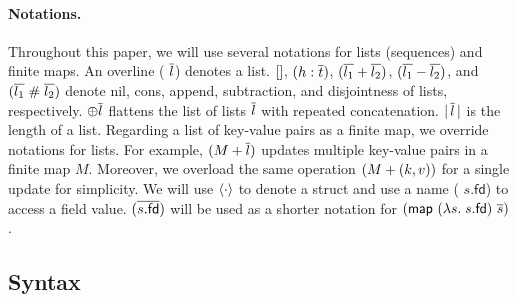 \documentclass[sigplan,10pt,review,anonymous,screen]{acmart}\settopmatter{printfolios=true,printccs=false,printacmref=false}
\begin{document}
\paragraph{Notations.}
Throughout this paper, we will use several notations for lists (sequences) and finite maps.
An overline (\eg{} $\overline{l}$) denotes a list.
$\lbrack\rbrack{}$, $(h : \overline{t})$, $(\overline{l_1} + \overline{l_2})$, $(\overline{l_1} - \overline{l_2})$, and
$(\overline{l_1} \; \# \; \overline{l_2})$ denote nil, cons, append, subtraction, and disjointness of lists, respectively.
$\oplus \overline{l}$ flattens the list of lists $\overline{l}$ with repeated concatenation.
$|\, \overline{l}\, |$ is the length of a list.
Regarding a list of key-value pairs as a finite map, we override notations for lists.
For example, $(M + \overline{l})$ updates multiple key-value pairs in a finite map $M$.
Moreover, we overload the same operation $(M + (k, v))$ for a single update for simplicity.
We will use $\langle \cdot \rangle$ to denote a struct and use a name (\eg{} $s.\textsf{fd}$) to access a field value.
$(\overline{s.\textsf{fd}})$ will be used as a shorter notation for $(\textsf{map}\ (\lambda s.\; s.\textsf{fd})\ \overline{s})$.

\subsection{Syntax}
\label{sec-syntax}
\end{document}
